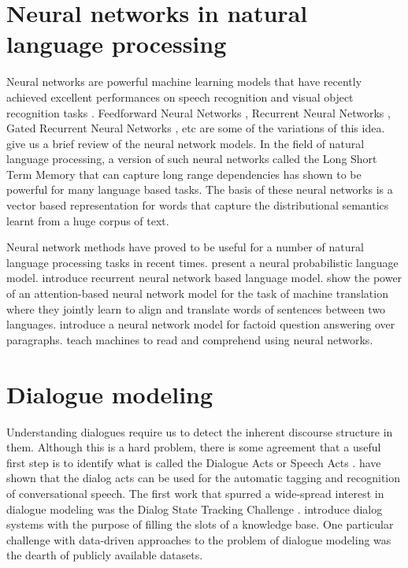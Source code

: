 \documentclass[11pt]{report}
\renewcommand\cite{\citep}	%
\begin{document}
\section{Neural networks in natural language processing}

Neural networks are powerful machine learning models that have recently achieved excellent performances on speech recognition \cite{hinton2012deep} and visual object recognition tasks \cite{krizhevsky2012imagenet}. Feedforward Neural Networks \cite{bebis1994feed}, Recurrent Neural Networks \cite{medsker2001recurrent}, Gated Recurrent Neural Networks \cite{bahdanau2014neural}, etc are some of the variations of this idea. \cite{lecun2015deep} give us a brief review of the neural network models. In the field of natural language processing, a version of such neural networks called the Long Short Term Memory \cite{hochreiter1997long} that can capture long range dependencies has shown to be powerful for many language based tasks. The basis of these neural networks is a vector based representation for words \cite{mikolov2013distributed,pennington2014glove} that capture the distributional semantics learnt from a huge corpus of text. 

Neural network methods have proved to be useful for a number of natural language processing tasks in recent times. \cite{bengio2003neural} present a neural probabilistic language model. \cite{mikolov2010recurrent} introduce recurrent neural network based language model.\cite{bahdanau2015neural} show the power of an attention-based neural network model for the task of machine translation where they jointly learn to align and translate words of sentences between two languages. \cite{iyyer2014neural} introduce a neural network model for factoid question answering over paragraphs. \cite{hermann2015teaching} teach machines to read and comprehend using neural networks. 

\section{Dialogue modeling}

Understanding dialogues require us to detect the inherent discourse structure in them. Although this is a hard problem, there is some agreement that a useful first step is to identify what is called the Dialogue Acts or Speech Acts \cite{searle1969speech}. \cite{stolcke2000dialogue} have shown that the dialog acts can be used for the automatic tagging and recognition of conversational speech. The first work that spurred a wide-spread interest in dialogue modeling was the Dialog State Tracking Challenge \cite{williams2013dialog}. \cite{lemon2006isu} introduce dialog systems with the purpose of filling the slots of a knowledge base. One particular challenge with data-driven approaches to the problem of dialogue modeling was the dearth of publicly available datasets. 
\end{document}
